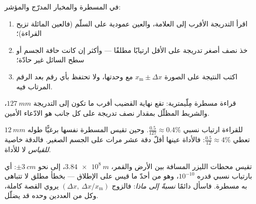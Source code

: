 \begin{method}\label{met:g10:orders-of-magnitude:reading}
في المسطرة والمخبار المدرّج والمؤشر:
\begin{enumerate}
  \item اقرأ التدريجة الأقرب إلى العلامة، والعين عمودية على
        السلّم (فالعين المائلة تزيح القراءة)؛
  \item خذ نصف أصغر تدريجة على الأقل ارتيابًا
        مطلقًا --- وأكثر إن كانت حافة الجسم أو سطح
        السائل غير حادّة؛
  \item اكتب النتيجة على الصورة $x_{\text{m}} \pm \Delta x$ مع وحدتها،
        ولا تحتفظ بأي رقم بعد الرقم المرتاب فيه.
\end{enumerate}
\end{method}

\begin{omfigure}

{\small قراءة مسطرة مِلّيمترية: تقع نهاية القضيب أقرب ما تكون إلى
التدريجة $\qty{127}{mm}$، والشريط المظلّل بمقدار نصف تدريجة
على كل جانب هو الادّعاء الأمين.}
\end{omfigure}

\begin{example}\label{ex:g10:orders-of-magnitude:reading}
للقراءة  ارتياب نسبي
$\frac{0.5}{127} \approx 0.4\%$. وحين تقيس المسطرة نفسها
برغيًّا طوله $\qty{12}{mm}$ تعطي $\frac{0.5}{12} \approx 4\%$: فالأداة عينها
أقلّ دقة عشر مرات على الجسم الصغير. فالدقة
خاصية \emph{للقياس} لا للأداة.
\end{example}

\begin{remark}\label{rem:g10:orders-of-magnitude:precision}
تقيس محطات الليزر المسافة بين الأرض والقمر، $\qty{3.84e8}{m}$، إلى
نحو $\pm\qty{3}{cm}$: أي بارتياب نسبي قدره $10^{-10}$، وهو من
أحدّ ما قيس على الإطلاق --- بخطأ مطلق لا تتباهى به
مسطرة. فاسأل دائمًا \emph{نسبةً إلى ماذا}: فالزوج
$(\Delta x,\ \Delta x / x_{\text{m}})$ يروي القصة كاملة، وكل
من العددين وحده قد يضلّل.
\end{remark}

